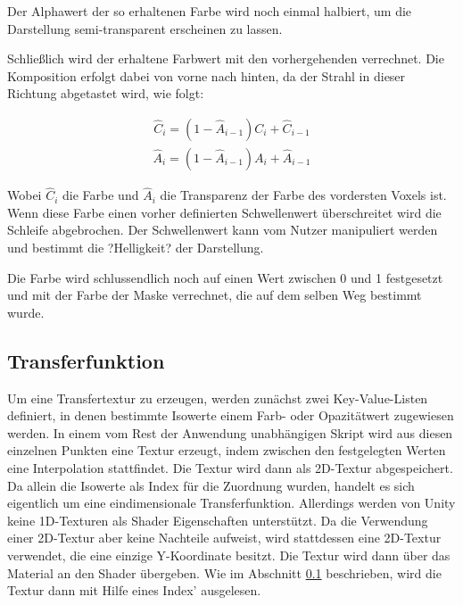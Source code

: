 Der Alphawert der so erhaltenen Farbe wird noch einmal halbiert, um die Darstellung semi-transparent erscheinen zu lassen.

Schließlich wird der erhaltene Farbwert mit den vorhergehenden verrechnet. Die Komposition erfolgt dabei von vorne nach hinten, da der Strahl in dieser Richtung abgetastet wird, wie folgt:

\begin{align}
\hat{C}_{i}=(1-\hat{A}_{i-1})C_{i}+\hat{C}_{i-1}
\end{align}
\begin{align}
\hat{A}_{i}=(1-\hat{A}_{i-1})A_{i}+\hat{A}_{i-1}
\end{align}

Wobei $\hat{C}_{i}$ die Farbe und $\hat{A}_{i}$ die Transparenz der Farbe des vordersten Voxels ist.
Wenn diese Farbe einen vorher definierten Schwellenwert überschreitet wird die Schleife abgebrochen. Der Schwellenwert kann vom Nutzer manipuliert werden und bestimmt die ?Helligkeit? der Darstellung.

Die Farbe wird schlussendlich noch auf einen Wert zwischen 0 und 1 festgesetzt und mit der Farbe der Maske verrechnet, die auf dem selben Weg bestimmt wurde.

\subsection{Transferfunktion}
\label{transfer}


Um eine Transfertextur zu erzeugen, werden zunächst zwei Key-Value-Listen definiert, in denen bestimmte Isowerte einem Farb- oder Opazitätwert zugewiesen werden. In einem vom Rest der Anwendung unabhängigen Skript wird aus diesen einzelnen Punkten eine Textur erzeugt, indem zwischen den festgelegten Werten eine Interpolation stattfindet.
Die Textur wird dann als 2D-Textur abgespeichert. Da allein die Isowerte als Index für die Zuordnung wurden, handelt es sich eigentlich um eine eindimensionale Transferfunktion. 
Allerdings werden von Unity keine 1D-Texturen als Shader Eigenschaften unterstützt. Da die Verwendung einer 2D-Textur aber keine Nachteile aufweist, wird stattdessen eine 2D-Textur verwendet, die eine einzige Y-Koordinate besitzt. 
Die Textur wird dann über das Material an den Shader übergeben. Wie im Abschnitt \ref{transfer} beschrieben, wird die Textur dann mit Hilfe eines Index' ausgelesen.

